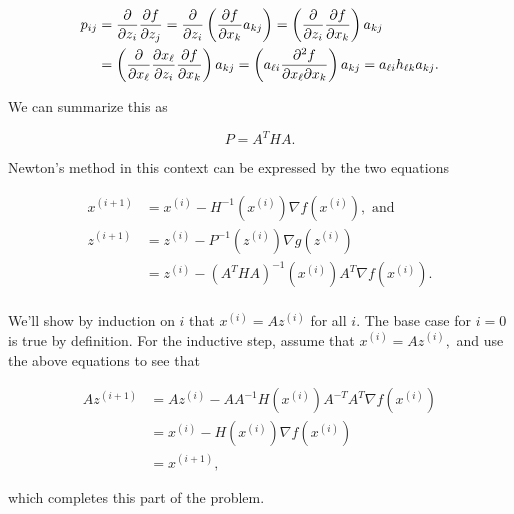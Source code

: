 \documentclass[]{article}
\begin{document}
\[
\begin{aligned}
p_{ij} & = \frac{\partial}{\partial z_i}\frac{\partial f}{\partial z_j} = \frac{\partial}{\partial z_i}\left(\frac{\partial f}{\partial x_k}a_{kj}\right)
= \left(\frac{\partial}{\partial z_i}\frac{\partial f}{\partial x_k}\right)a_{kj} \\
& = \left(\frac{\partial}{\partial x_\ell}\frac{\partial x_\ell}{\partial z_i}\frac{\partial f}{\partial x_k}\right)a_{kj}
= \left(a_{\ell i}\frac{\partial^2f}{\partial x_\ell\partial x_k}\right)a_{kj}
= a_{\ell i}h_{\ell k}a_{kj}.
\end{aligned}
\]

We can summarize this as

\[P = A^T H A.\]

Newton's method in this context can be expressed by the two equations

\[\begin{aligned}
x^{(i+1)} & = x^{(i)} - H^{-1}(x^{(i)}) \nabla f(x^{(i)}), \text{ and} \\
z^{(i+1)} & = z^{(i)} - P^{-1}(z^{(i)}) \nabla g(z^{(i)}) \\
          & = z^{(i)} - (A^THA)^{-1}(x^{(i)}) A^T\nabla f(x^{(i)}). \\
\end{aligned}\]

We'll show by induction on \(i\) that \(x^{(i)} = Az^{(i)}\) for all
\(i.\) The base case for \(i=0\) is true by definition. For the
inductive step, assume that \(x^{(i)} = Az^{(i)},\) and use the above
equations to see that

\[\begin{aligned}
Az^{(i+1)} & = Az^{(i)} - AA^{-1}H(x^{(i)})A^{-T}A^T\nabla f(x^{(i)}) \\
           & = x^{(i)} - H(x^{(i)}) \nabla f(x^{(i)}) \\
           & = x^{(i+1)},
\end{aligned}\]

which completes this part of the problem.
\end{document}
